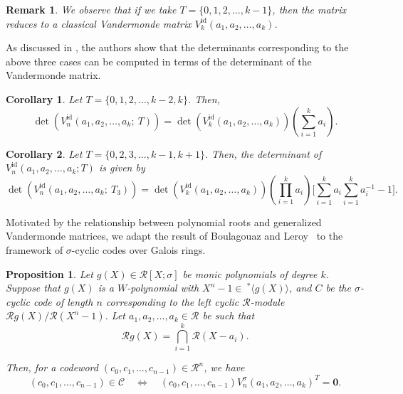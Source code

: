 \documentclass[11pt]{article}
\newtheorem{corollary}{Corollary}
\newtheorem{proposition}{Proposition}
\newtheorem{remark}{Remark}
\begin{document}
\begin{remark}
We observe that if we take $T=\{0,1,2,\dots,k-1\}$, then the matrix reduces to a  classical Vandermonde matrix $V^{\mathrm{id}}_k(a_1, a_2, \dots, a_k)$.
\end{remark}

 

As discussed in \cite{GuptanearMDS}, the authors show that the determinants corresponding to the above three cases can be computed in terms of the determinant of the Vandermonde matrix.

\begin{corollary}\cite[Corollary 3]{GuptanearMDS}\label{Corol3}
Let $T = \{0, 1, 2, \ldots, k-2, k\}$. Then, 
\[
\det\!\left(V^{\mathrm{id}}_n(a_1, a_2, \dots, a_k;~ T)\right) 
= \det\!\left(V^{\mathrm{id}}_k(a_1, a_2, \dots, a_k)\right) \left(\sum_{i=1}^{k} a_{i}\right).
\]
\end{corollary}
\begin{corollary}\cite[Corollary 5]{GuptanearMDS}\label{Corol5}
Let $T = \{0, 2, 3, \ldots, k-1, k+1\}.$
Then,  the determinant of $V^{\mathrm{id}}_n(a_1, a_2, \dots, a_k; T)$ is  given by 
\[
\det\!\left(V^{\mathrm{id}}_n(a_1, a_2, \dots, a_k;~ T_3)\right) 
= \det\!\left(V^{\mathrm{id}}_k(a_1, a_2, \dots, a_k)\right) 
\left(\prod_{i=1}^{k} a_{i}\right)
\Bigg[\sum_{i=1}^{k}a_i \sum_{i=1}^{k}a^{-1}_i-1\Bigg].
\]
\end{corollary}

	




	
	


%
%
Motivated by the relationship between polynomial roots and generalized Vandermonde matrices, we adapt the result of Boulagouaz and Leroy~\cite[Proposition~4]{Boulagouaz2013codes} to the framework of $\sigma$-cyclic codes over Galois rings.


\begin{proposition}\label{Pro005}
Let   $ g(X) \in \mathcal{R}[X;\sigma]$ be monic polynomials of degree $k$. Suppose that $g(X)$ is a $W$-polynomial with $X^n-1 \in ~^\ast\langle g(X)\rangle$, and  $C$ be the $\sigma$- cyclic code of length $n$ corresponding 
to the left cyclic $\mathcal{R}$-module $\mathcal{R} g(X)/\mathcal{R} (X^n-1)$. Let $a_1, a_2, \dots, a_k \in \mathcal{R}$ be such that 
\[
\mathcal{R} g(X) = \bigcap_{i=1}^k \mathcal{R}(X-a_i).
\] 

Then, for a codeword $(c_0, c_1, \dots, c_{n-1}) \in \mathcal{R}^n$, we have 
\[
(c_0, c_1, \dots, c_{n-1}) \in \mathcal{C} 
\quad \Longleftrightarrow \quad 
(c_0, c_1, \dots, c_{n-1}) V_n^\sigma(a_1, a_2, \dots, a_k)^T= \textbf{0}.
\]
\end{proposition}
\end{document}
